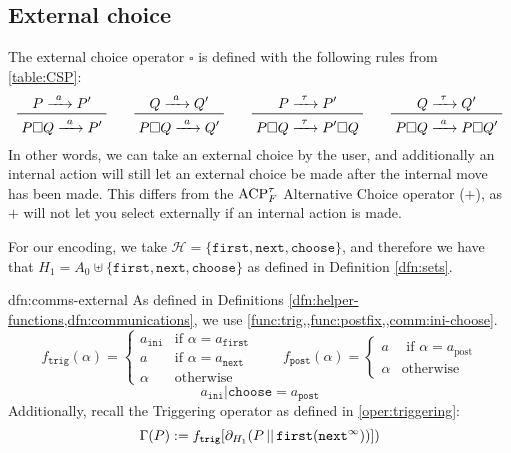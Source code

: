\documentclass[../hons_project.tex]{subfiles}
\begin{document}
\subsection{External choice}\label{ssec:external-choice}
The external choice operator $\square$ is defined with the following rules from \cref{table:CSP}:
\begin{equation*}\label{eq:csp-definition}
	\prftree{P \prightarrow{a} P'}{P \square Q \prightarrow{a} P'} \qquad \prftree{Q \prightarrow{a} Q'}{P \square Q \prightarrow{a} Q'} \qquad \prftree{P \prightarrow{\tau} P'}{P \square Q \prightarrow{\tau} P' \square Q} \qquad \prftree{Q \prightarrow{\tau} Q'}{P \square Q \prightarrow{a} P \square Q'}
\end{equation*}
In other words, we can take an external choice by the user, and additionally an internal action will still let an external choice be made after the internal move has been made. This differs from the $\acptf$ Alternative Choice operator ($+$), as $+$ will not let you select externally if an internal action is made.

For our encoding, we take $\mathscr{H} = \{\mathtt{first}, \mathtt{next}, \mathtt{choose}\}$, and therefore we have that $H_{1} = A_{0} \uplus \{\mathtt{first}, \mathtt{next}, \mathtt{choose}\}$ as defined in Definition \ref{dfn:sets}.

\begin{dfn}{dfn:comms-external}{}
	As defined in Definitions \cref{dfn:helper-functions,dfn:communications}, we use \cref{func:trig,,func:postfix,,comm:ini-choose}.
	\[f_{\mathtt{trig}}(\alpha) = \begin{cases}
			a_{\mathtt{ini}} & \text{if } \alpha = a_{\mathtt{first}} \\
			a                & \text{if } \alpha = a_{\mathtt{next}}  \\
			\alpha           & \text{otherwise}
		\end{cases} \qquad f_{\mathtt{post}}(\alpha) = \begin{cases}
			a      & \text{ if } \alpha = a_{\mathrm{post}} \\
			\alpha & \text{otherwise}
		\end{cases}
	\]
	\[ a_{\mathtt{ini}} | \mathtt{choose} = a_{\mathtt{post}} \]
	Additionally, recall the Triggering operator as defined in \ref{oper:triggering}:
	\[\Gamma(P) := f_{\mathtt{trig}}[\partial_{H_{1}}(P \merge \mathtt{first}(\mathtt{next}^{\infty}))])\]
\end{dfn}
\end{document}
